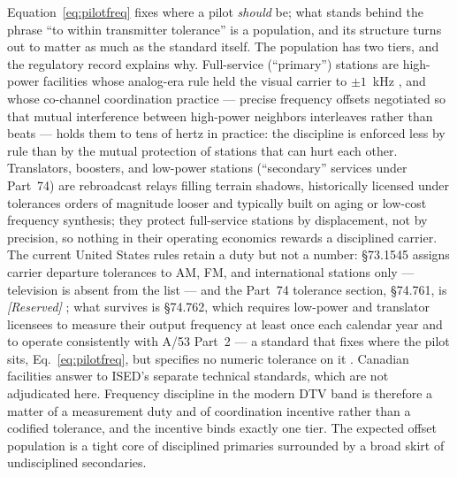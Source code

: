 Equation~\eqref{eq:pilotfreq} fixes where a pilot \emph{should} be; what stands behind the phrase ``to within transmitter tolerance'' is a population, and its structure turns out to matter as much as the standard itself. The population has two tiers, and the regulatory record explains why. Full-service (``primary'') stations are high-power facilities whose analog-era rule held the visual carrier to $\pm 1$~kHz \cite{cfr2015tv}, and whose co-channel coordination practice --- precise frequency offsets negotiated so that mutual interference between high-power neighbors interleaves rather than beats --- holds them to tens of hertz in practice: the discipline is enforced less by rule than by the mutual protection of stations that can hurt each other. Translators, boosters, and low-power stations (``secondary'' services under Part~74) are rebroadcast relays filling terrain shadows, historically licensed under tolerances orders of magnitude looser and typically built on aging or low-cost frequency synthesis; they protect full-service stations by displacement, not by precision, so nothing in their operating economics rewards a disciplined carrier. The current United States rules retain a duty but not a number: \S 73.1545 assigns carrier departure tolerances to AM, FM, and international stations only --- television is absent from the list --- and the Part~74 tolerance section, \S 74.761, is \emph{[Reserved]} \cite{cfr731545,cfr74761}; what survives is \S 74.762, which requires low-power and translator licensees to measure their output frequency at least once each calendar year and to operate consistently with A/53 Part~2 \cite{cfr74762} --- a standard that fixes where the pilot sits, Eq.~\eqref{eq:pilotfreq}, but specifies no numeric tolerance on it \cite{atsc-a53-part2}. Canadian facilities answer to ISED's separate technical standards, which are not adjudicated here. Frequency discipline in the modern DTV band is therefore a matter of a measurement duty and of coordination incentive rather than a codified tolerance, and the incentive binds exactly one tier. The expected offset population is a tight core of disciplined primaries surrounded by a broad skirt of undisciplined secondaries.


